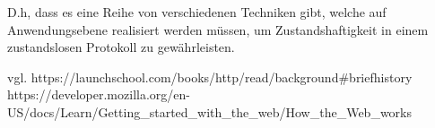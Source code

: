 D.h, dass es eine Reihe von verschiedenen Techniken gibt, welche auf Anwendungsebene realisiert werden müssen, um Zustandshaftigkeit in einem zustandslosen Protokoll zu gewährleisten.

vgl. https://launchschool.com/books/http/read/background#briefhistory
https://developer.mozilla.org/en-US/docs/Learn/Getting_started_with_the_web/How_the_Web_works

